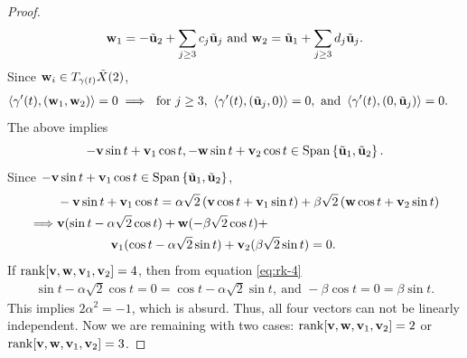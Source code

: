 \begin{proof}
	\begin{displaymath}
		 \mathbf{w}_1=-\tilde{\mathbf{u}}_2+\sum_{j\ge 3}c_j\tilde{\mathbf{u}}_j \text{ and } \mathbf{w}_2=\tilde{\mathbf{u}}_1+\sum_{j\ge 3}d_j\tilde{\mathbf{u}}_j.
	\end{displaymath}
	Since $\mathbf{w}_i\in T_{\gamma(t)}\tilde{X}(2)$, 
	\begin{align*}
		\left\langle \gamma'(t), \left(\mathbf{w}_1,\mathbf{w}_2\right) \right\rangle = 0 & \implies \text{ for } j\ge 3,~\left\langle \gamma'(t),\left(\tilde{\mathbf{u}}_j,0\right) \right\rangle = 0, \text{ and }  \left\langle \gamma'(t),\left(0,\tilde{\mathbf{u}}_j\right) \right\rangle = 0.
	\end{align*}
	The above implies 
	\begin{equation}
		 -\mathbf{v}\sin t+\mathbf{v}_1\cos t, -\mathbf{w}\sin t+\mathbf{v}_2\cos t\in \operatorname{Span} \left\{\tilde{\mathbf{u}}_1,\tilde{\mathbf{u}}_2\right\} \label{eq:spanning-cond}.
	\end{equation}
	Since $-\mathbf{v}\sin t+\mathbf{v}_1\cos t\in \operatorname{Span} \left\{\tilde{\mathbf{u}}_1,\tilde{\mathbf{u}}_2\right\}$, 
	\begin{align}
		 & -\mathbf{v}\sin t+\mathbf{v}_1\cos t = \alpha \sqrt{2} \left(\mathbf{v}\cos t+\mathbf{v}_1\sin t\right) + \beta\sqrt{2} \left(\mathbf{w}\cos t+\mathbf{v}_2\sin t\right)  \nonumber
		 \\ 
		 \implies & \mathbf{v}(\sin t-\alpha\sqrt{2}\cos t)+ \mathbf{w}(-\beta \sqrt{2}\cos t) + \nonumber \\
        & \kern 1.5cm \mathbf{v}_1 (\cos t-\alpha\sqrt{2}\sin t)  + \mathbf{v}_2(\beta\sqrt{2}\sin t) = 0. \label{eq:rk-4}
	\end{align}
	If $\operatorname{rank} [\mathbf{v},\mathbf{w},\mathbf{v}_1,\mathbf{v}_2]=4$, then from  equation \eqref{eq:rk-4}
	\begin{align*}
		\sin t-\alpha \sqrt{2}\cos t =0 = \cos t-\alpha\sqrt{2}\sin t,~\text{and }  -\beta\cos t=0=\beta \sin t.
	\end{align*}
	This implies $2\alpha^2=-1$, which is absurd. Thus, all four vectors can not be linearly independent. Now we are remaining with two cases: $\operatorname{rank} [\mathbf{v},\mathbf{w},\mathbf{v}_1,\mathbf{v}_2]=2$ or $\operatorname{rank} [\mathbf{v},\mathbf{w},\mathbf{v}_1,\mathbf{v}_2]=3$.


\end{proof}
